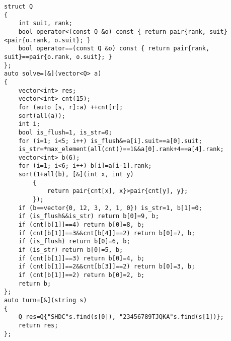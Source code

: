 \documentclass[12pt]{ctexart}
\begin{document}
\begin{lstlisting}
struct Q
{
	int suit, rank;
	bool operator<(const Q &o) const { return pair{rank, suit}<pair{o.rank, o.suit}; }
	bool operator==(const Q &o) const { return pair{rank, suit}==pair{o.rank, o.suit}; }
};
auto solve=[&](vector<Q> a)
{
	vector<int> res;
	vector<int> cnt(15);
	for (auto [s, r]:a) ++cnt[r];
	sort(all(a));
	int i;
	bool is_flush=1, is_str=0;
	for (i=1; i<5; i++) is_flush&=a[i].suit==a[0].suit;
	is_str=*max_element(all(cnt))==1&&a[0].rank+4==a[4].rank;
	vector<int> b(6);
	for (i=1; i<6; i++) b[i]=a[i-1].rank;
	sort(1+all(b), [&](int x, int y)
		{
			return pair{cnt[x], x}>pair{cnt[y], y};
		});
	if (b==vector{0, 12, 3, 2, 1, 0}) is_str=1, b[1]=0;
	if (is_flush&&is_str) return b[0]=9, b;
	if (cnt[b[1]]==4) return b[0]=8, b;
	if (cnt[b[1]]==3&&cnt[b[4]]==2) return b[0]=7, b;
	if (is_flush) return b[0]=6, b;
	if (is_str) return b[0]=5, b;
	if (cnt[b[1]]==3) return b[0]=4, b;
	if (cnt[b[1]]==2&&cnt[b[3]]==2) return b[0]=3, b;
	if (cnt[b[1]]==2) return b[0]=2, b;
	return b;
};
auto turn=[&](string s)
{
	Q res=Q{"SHDC"s.find(s[0]), "23456789TJQKA"s.find(s[1])};
	return res;
};
\end{lstlisting}
\end{document}

